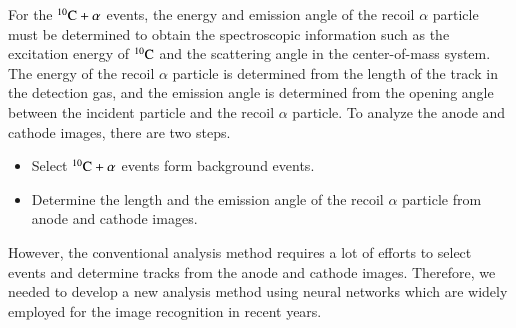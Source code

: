 \documentclass{jps-cp}
\begin{document}
For the ${}^{10}\rm{C}+\alpha$ events, the energy and emission angle of the recoil $\alpha$ particle must
be determined to obtain the spectroscopic information such as the excitation energy of ${}^{10}\rm{C}$
and the scattering angle in the center-of-mass system.
The energy of the recoil $\alpha$ particle is determined from the length of the track in the detection gas, and
the emission angle is determined from the opening angle between the incident particle and the recoil $\alpha$ particle.
To analyze the anode and cathode images, there are two steps.
\begin{itemize}
\item
  Select ${}^{10}\rm{C}+\alpha$ events form background events.
\item
  Determine the length and the emission angle of the recoil $\alpha$ particle from anode and cathode images.
\end{itemize}
However, the conventional analysis method requires a lot of efforts to select events and determine tracks from the anode and cathode images.
Therefore, we needed to develop a new analysis method using neural networks which are widely employed for the image recognition in recent years.
\end{document}
